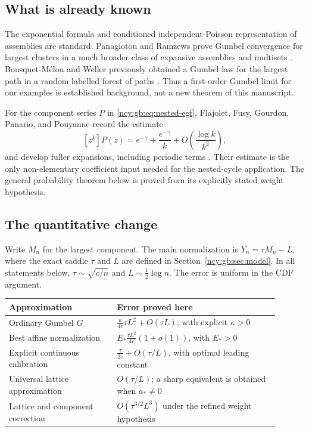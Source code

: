 \documentclass[11pt,letterpaper]{article}
\numberwithin{equation}{section}
\theoremstyle{remark}\newtheorem{remark}[theorem]{Remark}
\theoremstyle{definition}\newtheorem{definition}[theorem]{Definition}\theoremstyle{plain}
\begin{document}
\subsection{What is already known}

The exponential formula and conditioned independent-Poisson
representation of assemblies are standard. Panagiotou and Ramzews
prove Gumbel convergence for largest clusters in a much broader class
of expansive assemblies and multisets \cite[Theorem~1.2]{PR}.
Bousquet-M\'elou and Weller previously obtained a Gumbel law for the
largest path in a random labelled forest of paths
\cite[Proposition~9 in the conference version]{BMWconf,BMW}.
Thus a first-order Gumbel limit for our examples is established
background, not a new theorem of this manuscript.

For the component series \(P\) in \eqref{ncy:gb:eq:nested-egf}, Flajolet,
Fusy, Gourdon, Panario, and Pouyanne record the estimate
\begin{equation}\label{ncy:gb:eq:known-p}
 [z^k]P(z)=e^{-\gamma}
 +\frac{e^{-\gamma}}{k}
 +O\left(\frac{\log k}{k^2}\right),
\end{equation}
and develop fuller expansions, including periodic terms
\cite[Section~3, equation~(22), and Proposition~1]{hybrid}.
Their estimate is the only non-elementary coefficient input needed
for the nested-cycle application. The general probability theorem
below is proved from its explicitly stated weight hypothesis.

\subsection{The quantitative change}

Write \(M_n\) for the largest component. The main normalization is
\(Y_n=\tau M_n-L\), where the exact saddle \(\tau\) and \(L\) are
defined in Section~\ref{ncy:gb:sec:model}. In all statements below,
\(\tau\sim\sqrt{c/n}\) and \(L\sim\frac12\log n\).
The error is uniform in the CDF argument.

\begin{center}
\begin{tabular}{p{0.36\linewidth}p{0.54\linewidth}}
\toprule
Approximation & Error proved here\\
\midrule
Ordinary Gumbel \(G\) &
\(\displaystyle
 \frac{\kappa}{4c}\tau L^2+O(\tau L)\), with explicit \(\kappa>0\)\\[0.5em]
Best affine normalization &
\(\displaystyle E_*\frac{\tau L^2}{4c}(1+o(1))\), with \(E_*>0\)\\[0.5em]
Explicit continuous calibration &
\(\displaystyle \frac{\tau}{2e}+O(\tau/L)\), with optimal leading constant\\[0.5em]
Universal lattice approximation &
\(O(\tau/L)\); a sharp equivalent is obtained when \(a_*\ne0\)\\[0.5em]
Lattice and component correction &
\(O(\tau^{3/2}L^3)\) under the refined weight hypothesis\\
\bottomrule
\end{tabular}
\end{center}
\end{document}
